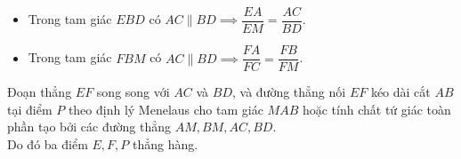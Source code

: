 \begin{bt}
{\begin{enumerate}[a)]
	\begin{itemize}
		\item Trong tam giác $EBD$ có $AC \parallel BD \implies \dfrac{EA}{EM} = \dfrac{AC}{BD}$.
		\item Trong tam giác $FBM$ có $AC \parallel BD \implies \dfrac{FA}{FC} = \dfrac{FB}{FM}$.
	\end{itemize}
	Đoạn thẳng $EF$ song song với $AC$ và $BD$, và đường thẳng nối $EF$ kéo dài cắt $AB$ tại điểm $P$ theo định lý Menelaus cho tam giác $MAB$ hoặc tính chất tứ giác toàn phần tạo bởi các đường thẳng $AM, BM, AC, BD$.\\
	Do đó ba điểm $E, F, P$ thẳng hàng.
\end{enumerate}
}
\end{bt}

